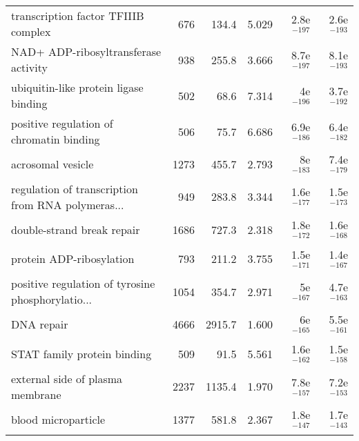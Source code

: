 \begin{longtable}{lrrrrr}
               transcription factor TFIIIB complex &                     676 &                   134.4 &      5.029 &        2.8e$^{-197}$ &        2.6e$^{-193}$ \\
              NAD+ ADP-ribosyltransferase activity &                     938 &                   255.8 &      3.666 &        8.7e$^{-197}$ &        8.1e$^{-193}$ \\
             ubiquitin-like protein ligase binding &                     502 &                    68.6 &      7.314 &          4e$^{-196}$ &        3.7e$^{-192}$ \\
          positive regulation of chromatin binding &                     506 &                    75.7 &      6.686 &        6.9e$^{-186}$ &        6.4e$^{-182}$ \\
                                 acrosomal vesicle &                    1273 &                   455.7 &      2.793 &          8e$^{-183}$ &        7.4e$^{-179}$ \\
 regulation of transcription from RNA polymeras... &                     949 &                   283.8 &      3.344 &        1.6e$^{-177}$ &        1.5e$^{-173}$ \\
                        double-strand break repair &                    1686 &                   727.3 &      2.318 &        1.8e$^{-172}$ &        1.6e$^{-168}$ \\
                          protein ADP-ribosylation &                     793 &                   211.2 &      3.755 &        1.5e$^{-171}$ &        1.4e$^{-167}$ \\
 positive regulation of tyrosine phosphorylatio... &                    1054 &                   354.7 &      2.971 &          5e$^{-167}$ &        4.7e$^{-163}$ \\
                                        DNA repair &                    4666 &                  2915.7 &      1.600 &          6e$^{-165}$ &        5.5e$^{-161}$ \\
                       STAT family protein binding &                     509 &                    91.5 &      5.561 &        1.6e$^{-162}$ &        1.5e$^{-158}$ \\
                  external side of plasma membrane &                    2237 &                  1135.4 &      1.970 &        7.8e$^{-157}$ &        7.2e$^{-153}$ \\
                               blood microparticle &                    1377 &                   581.8 &      2.367 &        1.8e$^{-147}$ &        1.7e$^{-143}$ \\

\end{longtable}
